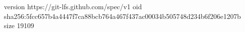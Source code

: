 version https://git-lfs.github.com/spec/v1
oid sha256:5fcc657b4a4447f7ca88bcb764a467f437ac00034b505748d234b6f206e1207b
size 19109
